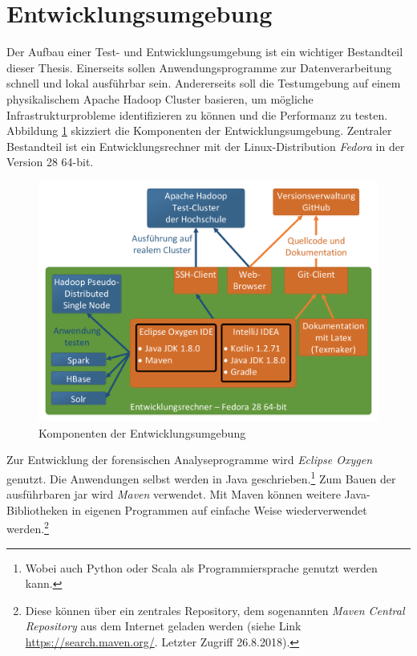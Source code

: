 \clearpage
\section{Entwicklungsumgebung}
\label{development_environment}
Der Aufbau einer Test- und Entwicklungsumgebung ist ein wichtiger Bestandteil dieser Thesis. Einerseits sollen Anwendungsprogramme zur Datenverarbeitung schnell und lokal ausführbar sein. Andererseits soll die Testumgebung auf einem physikalischem Apache Hadoop Cluster basieren, um mögliche Infrastrukturprobleme identifizieren zu können und die Performanz zu testen. \\

\noindent
Abbildung \ref{fig:development_environment} skizziert die Komponenten der Entwicklungsumgebung. Zentraler Bestandteil ist ein Entwicklungsrechner mit der Linux-Distribution \textit{Fedora} in der Version 28 64-bit.

\begin{figure}[ht]
  \centering
  \includegraphics[width=\textwidth]{./resource/development_environment.pdf}
  \caption{Komponenten der Entwicklungsumgebung}
  \label{fig:development_environment}
\end{figure} 

\noindent
Zur Entwicklung der forensischen Analyseprogramme wird \textit{Eclipse Oxygen} genutzt. Die Anwendungen selbst werden in Java geschrieben.\footnote{Wobei auch Python oder Scala als Programmiersprache genutzt werden kann.} Zum Bauen der ausführbaren \gls{jar} wird \textit{Maven} verwendet. Mit Maven können weitere Java-Bibliotheken 
in eigenen Programmen auf einfache Weise wiederverwendet werden.\footnote{Diese können über ein zentrales Repository, dem sogenannten \textit{Maven Central Repository} aus dem Internet geladen werden (siehe Link \url{https://search.maven.org/}. Letzter Zugriff 26.8.2018).}\\

